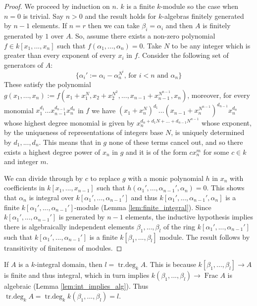 \documentclass[12pt]{article}
\theoremstyle{plain}
\theoremstyle{definition}
\newcommand{\lto}{\longrightarrow}
\begin{document}
\begin{proof}
We proceed by induction on $n$. $k$ is a finite $k$-module so the case when $n =0$ is trivial. Say $n > 0$ and the result holds for $k$-algebras finitely generated by $n-1$ elements. If $n = r$ then we can take $\beta_i = \alpha_i$ and then $A$ is finitely generated by $1$ over $A$. So, assume there exists a non-zero polynomial $f \in k[x_1,...,x_n]$ such that $f(\alpha_1,...,\alpha_n) = 0$. Take $N$ to be any integer which is greater than every exponent of every $x_i$ in $f$. Consider the following set of generators of $A$:
\[\lbrace \alpha_i' := \alpha_i - \alpha_n^{N^i}\text{,  for }i < n\text{ and }\alpha_n\rbrace\]
These satisfy the polynomial $g(x_1,...,x_n) := f(x_1 + x_1^{N},x_2 + x_2^{N^2},...,x_{n-1} + x_{n-1}^{N^{n-1}}, x_n)$, moreover, for every monomial $x_1^{d_1}...x_{n-1}^{d_{n-1}}x_{n}^{d_n}$ in $f$ we have $(x_1 + x_n^N)^{d_1}...(x_{n-1} + x_{n}^{N^{n-1}})^{d_{n-1}}x_n^{d_n}$ whose highest degree monomial is given by $x_n^{d_n + d_1N + ... + d_{n-1}N^{n-1}}$ whose exponent, by the uniqueness of representations of integers base $N$, is uniquely determined by $d_1,...,d_n$. This means that in $g$ none of these terms cancel out, and so there exists a highest degree power of $x_n$ in $g$ and it is of the form $cx_n^m$ for some $c \in k$ and integer $m$.

We can divide through by $c$ to replace $g$ with a monic polynomial $h$ in $x_n$ with coefficients in $k[x_1,...,x_{n-1}]$ such that $h(\alpha_1',...,\alpha_{n-1}',\alpha_n) = 0$. This shows that $\alpha_n$ is integral over $k[\alpha_1',...,\alpha_{n-1}']$ and thus $k[\alpha_1',...,\alpha_{n-1}',\alpha_n]$ is a finite $k[\alpha_1',...,\alpha_{n-1}']$-module (Lemma \ref{lem:finite_integral}). Since $k[\alpha_1',...,\alpha_{n-1}']$ is generated by $n-1$ elements, the inductive hypothesis implies there is algebraically independent elements $\beta_1,...,\beta_{l}$ of the ring $k[\alpha_1',...,\alpha_{n-1}']$ such that $k[\alpha_1',...,\alpha_{n-1}']$ is a finite $k[\beta_1,...,\beta_l]$ module. The result follows by transitivity of finiteness of modules.
\end{proof}
If $A$ is a $k$-integral domain, then $l = \operatorname{tr.deg}_kA$. This is because $k[\beta_1,...,\beta_l] \lto A$ is finite and thus integral, which in turn implies $k(\beta_1,...,\beta_l) \lto \operatorname{Frac}A$ is algebraic (Lemma \ref{lem:int_implies_alg}). Thus $\operatorname{tr.deg}_kA = \operatorname{tr.deg}_kk(\beta_1,...,\beta_l) = l$.
\end{document}
